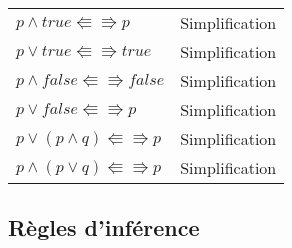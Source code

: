 \begin{center}
\begin{tabular}{ll}
			$p \land true \Lleftarrow \Rrightarrow p$ & Simplification\\
			$p \lor true \Lleftarrow \Rrightarrow true$ & Simplification\\
			$p \land false \Lleftarrow \Rrightarrow false$ & Simplification\\
			$p \lor false \Lleftarrow \Rrightarrow p$ & Simplification\\
			$p \lor (p \land q) \Lleftarrow \Rrightarrow p$ & Simplification\\
			$p \land (p \lor q) \Lleftarrow \Rrightarrow p$ & Simplification\\
			\end{tabular}
			\end{center}

\subsection{Règles d'inférence}

